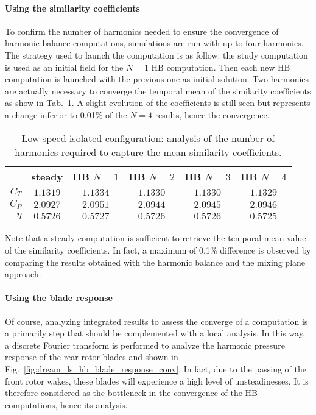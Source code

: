\paragraph{Using the similarity coefficients}
\label{par:dream_ls_conv_hb_sim_coeff}
To confirm the number of harmonics needed to ensure the convergence
of harmonic balance computations, simulations are run with up to four
harmonics. The strategy used to launch the computation is as follow:
the study computation is used as an initial field for the $N=1$ HB computation.
Then each new HB computation is launched with the previous one as initial
solution.
Two harmonics are actually necessary to converge the temporal mean 
of the similarity coefficients as show 
in Tab.~\ref{tab:dream_ls_hb_conv_sim}. A slight evolution of the
coefficients is still seen but represents a change inferior to 0.01\%
of the $N=4$ results, hence the convergence. 
\begin{table}[htp]
   \centering
  \begin{tabular}{rccccc}
    \toprule
    & steady & HB $N=1$ & HB $N=2$ & HB $N=3$ & HB $N=4$ \\
    \midrule
    $C_T$  & $1.1319$ & $1.1334$ & $1.1330$ & $1.1330$ & $1.1329$ \\
    $C_P$  & $2.0927$ & $2.0951$ & $2.0944$ & $2.0945$ & $2.0946$ \\
    $\eta$ & $0.5726$ & $0.5727$ & $0.5726$ & $0.5726$ & $0.5725$ \\
    \bottomrule
  \end{tabular}
  \caption{Low-speed isolated configuration: analysis of the number of harmonics
  required to capture the mean similarity coefficients.}
  \label{tab:dream_ls_hb_conv_sim}
\end{table}
Note that a steady computation is sufficient to retrieve
the temporal mean value of the similarity coefficients.
In fact, a maximum of 0.1\% difference is observed by
comparing the results obtained with the harmonic balance and the
mixing plane approach.

\paragraph{Using the blade response}
\label{par:dream_ls_conv_hb_blade_response}
Of course, analyzing integrated results to assess the converge of
a computation is a primarily step that should be complemented with
a local analysis. In this way, a discrete Fourier transform is
performed to analyze the harmonic pressure response of the 
rear rotor blades and shown in 
Fig.~\ref{fig:dream_ls_hb_blade_response_conv}. In fact, due to the passing
of the front rotor wakes, these blades will experience a
high level of unsteadinesses. It is therefore considered as the
bottleneck in the convergence of the HB computations, hence its analysis.

